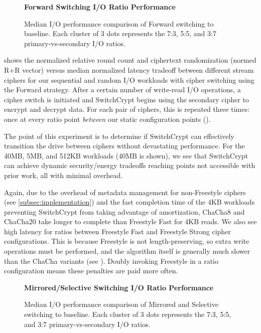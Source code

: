 \begin{figure}[ht]
  \textbf{Forward Switching I/O Ratio Performance}\par\medskip
  {} \caption{Median I/O performance
  comparison of Forward switching to baseline. Each cluster of 3 dots represents
  the 7:3, 5:5, and 3:7 primary-vs-secondary I/O ratios.}
 \label{fig:tradeoff-with-ratios}
\end{figure}

 shows the normalized relative round count and
ciphertext randomization (normed R+R vector) versus median normalized latency
tradeoff between different stream ciphers for our sequential and random I/O
workloads with cipher switching using the Forward strategy. After a certain
number of write-read I/O operations, a cipher switch is initiated and
SwitchCrypt begins using the secondary cipher to encrypt and decrypt data. For
each pair of ciphers, this is repeated three times: once at every ratio point
\emph{between} our static configuration points ().

The point of this experiment is to determine if SwitchCrypt can effectively
transition the drive between ciphers without devastating performance. For the
40MB, 5MB, and 512KB workloads (40MB is shown), we see that SwitchCrypt can
achieve dynamic security/energy tradeoffs reaching points not accessible with
prior work, all with minimal overhead.

Again, due to the overhead of metadata management for non-Freestyle ciphers (see
\cref{subsec:implementation}) and the fast completion time of the 4KB workloads
preventing SwitchCrypt from taking advantage of amortization, ChaCha8 and
ChaCha20 take longer to complete than Freestyle Fast for 4KB reads. We also see
high latency for ratios between Freestyle Fast and Freestyle Strong cipher
configurations. This is because Freestyle is not length-preserving, so extra
write operations must be performed, and the algorithm itself is generally much
slower than the ChaCha variants (see ). Doubly
invoking Freestyle in a ratio configuration means these penalties are paid more
often.

\begin{figure}[ht]
  \textbf{Mirrored/Selective Switching I/O Ratio Performance}\par\medskip
  \centering
  {} \caption{Median I/O performance
  comparison of Mirrored and Selective switching to baseline. Each cluster of 3
  dots represents the 7:3, 5:5, and 3:7 primary-vs-secondary I/O ratios.}
 \label{fig:mirrored-selective-baseline}
\end{figure}


